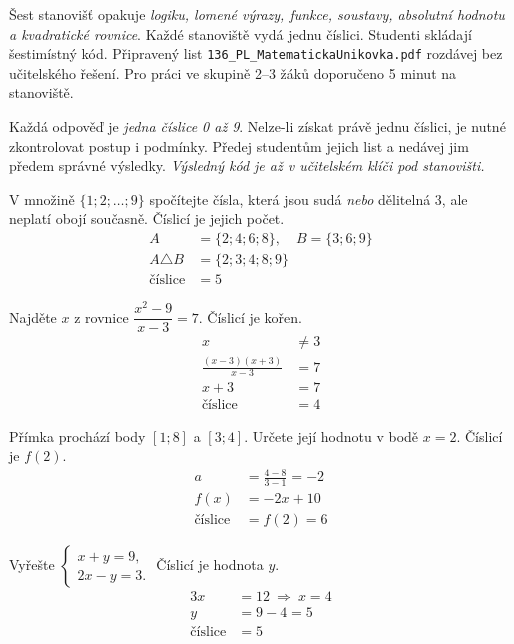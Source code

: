 \documentclass[11pt,a4paper]{article}
\begin{document}
Šest stanovišť opakuje \emph{logiku, lomené výrazy, funkce, soustavy, absolutní hodnotu a kvadratické rovnice}. Každé stanoviště vydá jednu číslici. Studenti skládají šestimístný kód. Připravený list \texttt{136\_PL\_MatematickaUnikovka.pdf} rozdávej bez učitelského řešení. Pro práci ve skupině 2--3 žáků doporučeno 5 minut na stanoviště.
\begin{prikladReseniBox}[title={Příklad 1}]
Každá odpověď je \emph{jedna číslice 0 až 9}. Nelze-li získat právě jednu číslici, je nutné zkontrolovat postup i podmínky. Předej studentům jejich list a nedávej jim předem správné výsledky.
\tcblower
\emph{Výsledný kód je až v učitelském klíči pod stanovišti.}
\end{prikladReseniBox}
\begin{prikladReseniBox}[title={Příklad 2}]
V množině $\{1;2;\dots;9\}$ spočítejte čísla, která jsou sudá \emph{nebo} dělitelná $3$, ale neplatí obojí současně. Číslicí je jejich počet.
\tcblower
\[
\begin{aligned}
A&=\{2;4;6;8\},\quad B=\{3;6;9\}\\
A\triangle B&=\{2;3;4;8;9\}\\
\text{číslice}&=5
\end{aligned}
\]

\end{prikladReseniBox}
\begin{prikladReseniBox}[title={Příklad 3}]
Najděte $x$ z rovnice $\dfrac{x^2-9}{x-3}=7$. Číslicí je kořen.
\tcblower
\[
\begin{aligned}
x&\ne3\\
\frac{(x-3)(x+3)}{x-3}&=7\\
x+3&=7\\
\text{číslice}&=4
\end{aligned}
\]

\end{prikladReseniBox}
\begin{prikladReseniBox}[title={Příklad 4}]
Přímka prochází body $[1;8]$ a $[3;4]$. Určete její hodnotu v bodě $x=2$. Číslicí je $f(2)$.
\tcblower
\[
\begin{aligned}
a&=\frac{4-8}{3-1}=-2\\
f(x)&=-2x+10\\
\text{číslice}&=f(2)=6
\end{aligned}
\]

\end{prikladReseniBox}
\begin{prikladReseniBox}[title={Příklad 5}]
Vyřešte $\begin{cases}x+y=9,\\2x-y=3.\end{cases}$ Číslicí je hodnota $y$.
\tcblower
\[
\begin{aligned}
3x&=12\ \Rightarrow\ x=4\\
y&=9-4=5\\
\text{číslice}&=5
\end{aligned}
\]

\end{prikladReseniBox}
\end{document}
